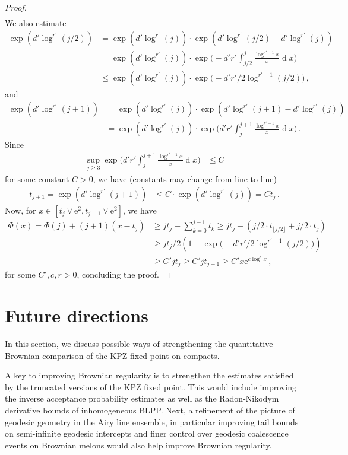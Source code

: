 \documentclass[11pt, reqno]{amsart}
\numberwithin{equation}{section}
\newcommand{\diff}{\ensuremath{\operatorname{d}\!}}
\begin{document}
\begin{proof}
\begin{align*}
\end{align*}
We also estimate 
\begin{align*}
    \exp(d'\log^{r'}(j/2))&= \exp(d'\log^{r'}(j))\cdot \exp(d'\log^{r'}(j/2)-d'\log^{r'}(j))\\
    &=\exp(d'\log^{r'}(j))\cdot \exp\bigg(-d'r'\int^{j}_{j/2}\frac{\log^{r'-1}x}{x}\diff x\bigg)\\
    &\le \exp(d'\log^{r'}(j))\cdot \exp\bigg(-d'r'/2\log^{r'-1}(j/2)\bigg)\,, 
\end{align*}
and
\begin{align*}
    \exp(d'\log^{r'}(j+1))&= \exp(d'\log^{r'}(j))\cdot \exp(d'\log^{r'}(j+1)-d'\log^{r'}(j))\\
    &=\exp(d'\log^{r'}(j))\cdot \exp\bigg(d'r'\int^{j+1}_j\frac{\log^{r'-1}x}{x}\diff x\bigg)\,.
\end{align*}
Since
\begin{align*}
    \sup_{j\ge 3}\exp\bigg(d'r'\int^{j+1}_j\frac{\log^{r'-1}x}{x}\diff x\bigg)&\le C
\end{align*}
for some constant $C> 0$, we have (constants may change from line to line)
\begin{align*}
    t_{j+1} = \exp(d'\log^{r'}(j+1))&\le C\cdot \exp(d'\log^{r'}(j)) = Ct_j\,.
\end{align*}
Now, for $x\in [t_j\lor \mathrm{e}^2, t_{j+1}\lor \mathrm{e}^2]$, we have
\begin{align*}
    \Phi(x) = \Phi(j)+(j+1)(x-t_j)&\ge  jt_j- \sum_{k = 0}^{j-1}t_k\ge jt_j - (j/2\cdot t_{\lfloor j/2\rfloor} + j/2 \cdot t_{j})\\
    &\ge jt_j/2\left(1 - \exp\bigg(-d'r'/2\log^{r'-1}(j/2)\bigg)\right)\\
    &\ge C'jt_j \ge C'jt_{j+1}\ge C' x \mathrm{e}^{c\log^r x}\,,
\end{align*}
for some $C', c, r > 0$, concluding the proof.
\end{proof}
\color{black}
\section{Future directions}\label{sec: outlook}

In this section, we discuss possible ways of strengthening the quantitative Brownian comparison of the KPZ fixed point on compacts.

A key to improving Brownian regularity is to strengthen the estimates satisfied by the truncated versions of the KPZ fixed point. This would include improving the inverse acceptance probability estimates as well as the Radon-Nikodym derivative bounds of inhomogeneous BLPP. Next, a refinement of the picture of geodesic geometry in the Airy line ensemble, in particular improving tail bounds on semi-infinite geodesic intercepts and finer control over geodesic coalescence events on Brownian melons would also help improve Brownian regularity.
\end{document}
